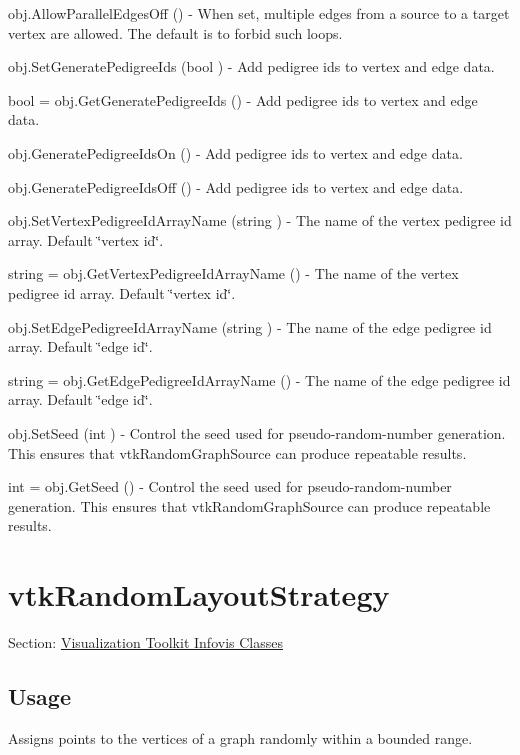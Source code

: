 \begin{DoxyItemize}
\item {\ttfamily obj.\-Allow\-Parallel\-Edges\-Off ()} -\/ When set, multiple edges from a source to a target vertex are allowed. The default is to forbid such loops.  
\item {\ttfamily obj.\-Set\-Generate\-Pedigree\-Ids (bool )} -\/ Add pedigree ids to vertex and edge data.  
\item {\ttfamily bool = obj.\-Get\-Generate\-Pedigree\-Ids ()} -\/ Add pedigree ids to vertex and edge data.  
\item {\ttfamily obj.\-Generate\-Pedigree\-Ids\-On ()} -\/ Add pedigree ids to vertex and edge data.  
\item {\ttfamily obj.\-Generate\-Pedigree\-Ids\-Off ()} -\/ Add pedigree ids to vertex and edge data.  
\item {\ttfamily obj.\-Set\-Vertex\-Pedigree\-Id\-Array\-Name (string )} -\/ The name of the vertex pedigree id array. Default \char`\"{}vertex id\char`\"{}.  
\item {\ttfamily string = obj.\-Get\-Vertex\-Pedigree\-Id\-Array\-Name ()} -\/ The name of the vertex pedigree id array. Default \char`\"{}vertex id\char`\"{}.  
\item {\ttfamily obj.\-Set\-Edge\-Pedigree\-Id\-Array\-Name (string )} -\/ The name of the edge pedigree id array. Default \char`\"{}edge id\char`\"{}.  
\item {\ttfamily string = obj.\-Get\-Edge\-Pedigree\-Id\-Array\-Name ()} -\/ The name of the edge pedigree id array. Default \char`\"{}edge id\char`\"{}.  
\item {\ttfamily obj.\-Set\-Seed (int )} -\/ Control the seed used for pseudo-\/random-\/number generation. This ensures that vtk\-Random\-Graph\-Source can produce repeatable results.  
\item {\ttfamily int = obj.\-Get\-Seed ()} -\/ Control the seed used for pseudo-\/random-\/number generation. This ensures that vtk\-Random\-Graph\-Source can produce repeatable results.  
\end{DoxyItemize}\hypertarget{vtkinfovis_vtkrandomlayoutstrategy}{}\section{vtk\-Random\-Layout\-Strategy}\label{vtkinfovis_vtkrandomlayoutstrategy}
Section\-: \hyperlink{sec_vtkinfovis}{Visualization Toolkit Infovis Classes} \hypertarget{vtkwidgets_vtkxyplotwidget_Usage}{}\subsection{Usage}\label{vtkwidgets_vtkxyplotwidget_Usage}
Assigns points to the vertices of a graph randomly within a bounded range.

